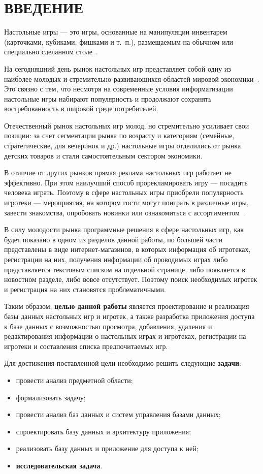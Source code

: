 \chapter*{ВВЕДЕНИЕ}

Настольные игры --- это игры, основанные на манипуляции инвентарем (карточками,
кубиками, фишками и т.~п.), размещаемым на обычном или специально сделанном
столе~\cite{art01}.

На сегодняшний день рынок настольных игр представляет собой одну из наиболее
молодых и стремительно развивающихся областей мировой
экономики~\cite{art02}. Это связно с тем, что несмотря на современные условия
информатизации настольные игры набирают популярность и продолжают сохранять
востребованность в широкой среде потребителей.

Отечественный рынок настольных игр молод, но стремительно усиливает свои
позиции: за счет сегментации рынка по возрасту и категориям (семейные,
стратегические, для вечеринок и др.) настольные игры отделились от рынка
детских товаров и стали самостоятельным сектором экономики.

В отличие от других рынков прямая реклама настольных игр работает не эффективно.
При этом наилучший способ прорекламировать игру --- посадить человека играть.
Поэтому в сфере настольных игры приобрели популярность игротеки --- мероприятия,
на котором гости могут поиграть в различные игры, завести знакомства, опробовать
новинки или ознакомиться с ассортиментом~\cite{art03}.

В силу молодости рынка программные решения в сфере настольных игр, как будет
показано в одном из разделов данной работы, по большей части представлены в виде
интернет-магазинов, в которых информация об игротеках, регистрации на них,
получения информации об проводимых играх либо представляется текстовым списком
на отдельной странице, либо появляется в новостном разделе, либо вовсе
отсутствует.  Поэтому поиск необходимых игротек и регистрация на них становятся
проблематичными.

Таким образом, \textbf{целью данной работы} является проектирование и реализация
базы данных настольных игр и игротек, а также разработка приложения доступа к
базе данных с возможностью просмотра, добавления, удаления и редактирования
информации о настольных играх и игротеках, регистрации на игротеки и составления
списка предпочитаемых игр.

Для достижения поставленной цели необходимо решить следующие \textbf{задачи}:
\begin{itemize}
    \item провести анализ предметной области;
    \item формализовать задачу;
    \item провести анализ баз данных и систем управления базами данных;
    \item спроектировать базу данных и архитектуру приложения;
    \item реализовать базу данных и приложение для доступа к ней;
    \item \textbf{исследовательская задача}.
\end{itemize}

